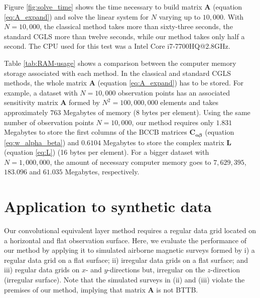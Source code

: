 \documentclass[manuscript,noblind]{geophysics}
\begin{document}
Figure \ref{fig:solve_time} shows the time necessary to build matrix $\mathbf{A}$ 
(equation \ref{eq:A_expand}) and solve the linear system for $N$ varying up to $10,000$. 
With $N = 10,000$, the classical method takes more than sixty-three seconds, the standard 
CGLS more than twelve seconds, while our method takes only half a second. 
The CPU used for this test was a Intel Core i7-7700HQ@2.8GHz.


Table \ref{tab:RAM-usage} shows a comparison between the computer memory storage 
associated with each method. In the classical and standard CGLS methods, the whole 
matrix $\mathbf{A}$ (equation \ref{eq:A_expand}) has to be stored. For example, a dataset with 
$N = 10,000$ observation points has an associated sensitivity matrix $\mathbf{A}$ formed by 
$N^2 = 100,000,000$ elements and takes approximately $763$ Megabytes of memory (8 bytes per element). 
Using the same number of observation points $N = 10,000$, our method requires only 
$1.831$ Megabytes to store the first columns of the BCCB matrices
$\mathbf{C}_{\boldsymbol{\alpha\beta}}$ (equation \ref{eq:w_alpha_beta}) and 
$0.6104$ Megabytes to store the complex matrix $\mathbf{L}$ (equation \ref{eq:L}) 
(16 bytes per element). For a bigger dataset with $N = 1,000,000$, the amount of necessary computer memory 
goes to $7,629,395$, $183.096$ and $61.035$ Megabytes, respectively.

\section{Application to synthetic data}

Our convolutional equivalent layer method requires a regular data grid located on a 
horizontal and flat observation surface.
Here, we evaluate the performance of our method by applying it to simulated airborne magnetic 
surveys formed by
i) a regular data grid on a flat surface;
ii) irregular data grids on a flat surface; and 
iii) regular data grids on $x$- and $y$-directions but, irregular on the $z$-direction (irregular surface).
Note that the simulated surveys in (ii) and (iii) violate the premises of our method, implying 
that matrix $\mathbf{A}$ is not BTTB.
\end{document}
